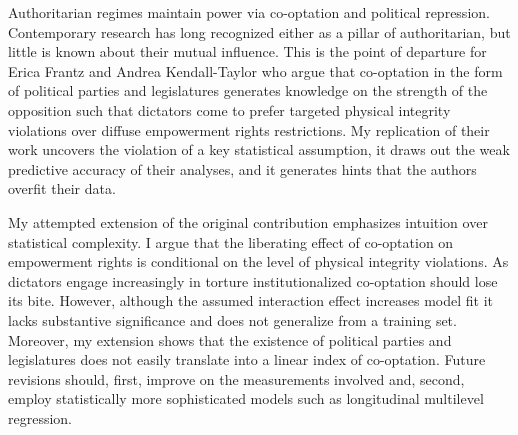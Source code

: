 Authoritarian regimes maintain power via co-optation and 
political repression. Contemporary research has long 
recognized either as a pillar of authoritarian, but little
is known about their mutual influence. This is the point of 
departure for Erica Frantz and Andrea Kendall-Taylor who argue
that co-optation in the form of political parties and 
legislatures generates knowledge on the strength of the 
opposition such that dictators come to prefer targeted 
physical integrity violations over diffuse empowerment rights
restrictions. My replication of their work uncovers the 
violation of a key statistical assumption, it draws out the
weak predictive accuracy of their analyses, and it generates
hints that the authors overfit their data. 

My attempted extension of the original contribution 
emphasizes intuition over statistical complexity. I argue 
that the liberating effect of co-optation on empowerment 
rights is conditional on the level of physical integrity
violations. As dictators engage increasingly in torture 
institutionalized co-optation should lose its bite. However,
although the assumed interaction effect increases model fit
it lacks substantive significance and does not generalize
from a training set. Moreover, my extension shows that 
the existence of political parties and legislatures does not
easily translate into a linear index of co-optation. Future
revisions should, first, improve on the measurements 
involved and, second, employ statistically more
sophisticated models such as longitudinal multilevel 
regression.
